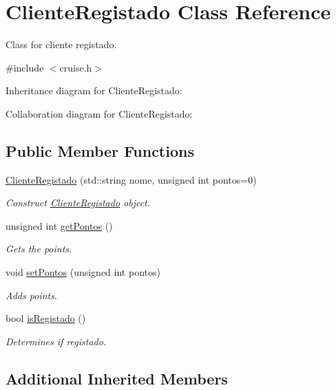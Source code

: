 \hypertarget{classClienteRegistado}{}\section{Cliente\+Registado Class Reference}
\label{classClienteRegistado}


Class for cliente registado.  




{\ttfamily \#include $<$cruise.\+h$>$}



Inheritance diagram for Cliente\+Registado\+:


Collaboration diagram for Cliente\+Registado\+:
\subsection*{Public Member Functions}
\begin{DoxyCompactItemize}
\item 
\hyperlink{classClienteRegistado_a27df6b812a22aa40e43968b4cfc7eec6}{Cliente\+Registado} (std\+::string nome, unsigned int pontos=0)
\begin{DoxyCompactList}\small\item\em Construct \hyperlink{classClienteRegistado}{Cliente\+Registado} object. \end{DoxyCompactList}\item 
unsigned int \hyperlink{classClienteRegistado_a0118e31f16e4dce542f5e1d124d26c61}{get\+Pontos} ()
\begin{DoxyCompactList}\small\item\em Gets the points. \end{DoxyCompactList}\item 
void \hyperlink{classClienteRegistado_a93d79ba4ecd6716124c832fc2f38ddc5}{set\+Pontos} (unsigned int pontos)
\begin{DoxyCompactList}\small\item\em Adds points. \end{DoxyCompactList}\item 
bool \hyperlink{classClienteRegistado_a3dade20423acb0e84c9fbe30c75f0e3e}{is\+Registado} ()
\begin{DoxyCompactList}\small\item\em Determines if registado. \end{DoxyCompactList}\end{DoxyCompactItemize}
\subsection*{Additional Inherited Members}


